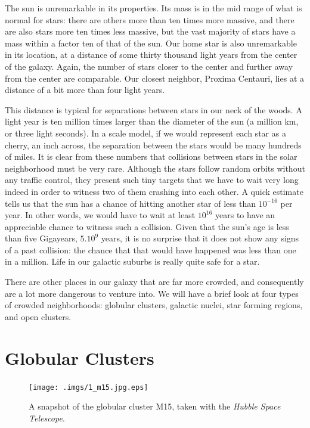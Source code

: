 \documentclass{book}
\begin{document}
The sun is unremarkable in its properties.  Its mass is in
the mid range of what is normal for stars: there are others more than
ten times more massive, and there are also stars more ten times less
massive, but the vast majority of stars have a mass within a factor
ten of that of the sun.  Our home star is also unremarkable in its
location, at a distance of some thirty thousand light years from the
center of the galaxy.  Again, the number of stars closer to the center
and further away from the center are comparable.  Our closest neighbor,
Proxima Centauri, lies at a distance of a bit more than four light years.

This distance is typical for separations between stars in our neck of
the woods.  A light year is ten million times larger than the diameter
of the sun (a million km, or three light seconds).  In a scale model,
if we would represent each star as a cherry, an inch across, the
separation between the stars would be many hundreds of miles.  It is
clear from these numbers that collisions between stars in the solar
neighborhood must be very rare.  Although the stars follow random
orbits without any traffic control, they present such tiny targets
that we have to wait very long indeed in order to witness two of them
crashing into each other.  A quick estimate tells us that the sun has
a chance of hitting another star of less than  $10^{-16}$
per year.  In other words, we would have to wait at least
 $10^{16}$ years to have an appreciable chance to witness
such a collision.  Given that the sun's age is less than five Gigayears,
 $5.10^9$ years, it is no surprise that it does not show
any signs of a past collision: the chance that that would have
happened was less than one in a million.  Life in our galactic suburbs
is really quite safe for a star.

There are other places in our galaxy that are far more crowded, and
consequently are a lot more dangerous to venture into.  We will have
a brief look at four types of crowded neighborhoods: globular
clusters, galactic nuclei, star forming regions, and open clusters.

\section{  Globular Clusters}
\label{sect:6}


 
\begin{figure}
\begin{minipage}{\columnwidth}
\begin{center}
\renewcommand{\thefootnote}{\alph{footnote}}
    \texttt{[image: .imgs/1\_m15.jpg.eps]}
\caption{A snapshot of the globular cluster M15, taken with the
 {\it Hubble Space Telescope\protect \footnotemark[1]}.
}

\label{m15}
\end{center}
\end{minipage}
\end{figure}
\end{document}
